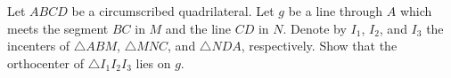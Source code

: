 Let $ABCD$ be a circumscribed quadrilateral. Let $g$ be a line through $A$ which meets the segment $BC$ in $M$ and the line $CD$ in $N$. Denote by $I_1$, $I_2$, and $I_3$ the incenters of $\triangle ABM$, $\triangle MNC$, and $\triangle NDA$, respectively. Show that the orthocenter of $\triangle I_1 I_2 I_3$ lies on $g$.
